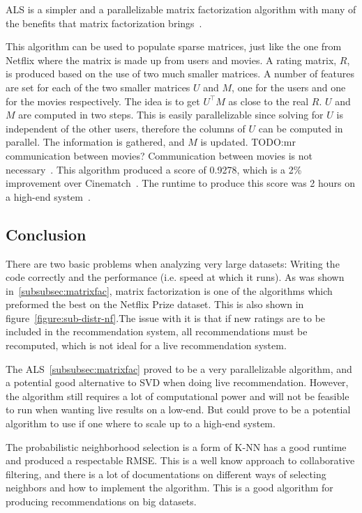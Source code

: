 ALS is a simpler and a parallelizable matrix factorization algorithm with many of the benefits that matrix factorization brings~\cite{predusingmatrix}.

This algorithm can be used to populate sparse matrices, just like the one from Netflix where the matrix is made up from users and movies. A rating matrix, $R$, is produced based on the use of two much smaller matrices. A number of features are set for each of the two smaller matrices $U$ and $M$, one for the users and one for the movies respectively. The idea is to get $U^\top M$ as close to the real $R$. $U$ and $M$ are computed in two steps. This is easily parallelizable since solving for $U$ is independent of the other users, therefore the columns of $U$ can be computed in parallel. The information is gathered, and $M$ is updated.
TODO:mr communication between movies?
Communication between movies is not necessary~\cite{myrrix}. This algorithm produced a score of 0.9278, which is a 2\% improvement over Cinematch~\cite{predusingmatrix}. The runtime to produce this score was 2 hours on a high-end system~\cite{alsMPI}.


\subsection{Conclusion}\label{subsec:sim-sys-conc}
There are two basic problems when analyzing very large datasets: Writing the code correctly and the performance (i.e. speed at which it runs). As was shown in~\ref{subsubsec:matrixfac}, matrix factorization is one of the algorithms which preformed the best on the Netflix Prize dataset. This is also shown in figure~\ref{figure:sub-distr-nf}.The issue with it is that if new ratings are to be included in the recommendation system,  all recommendations must be recomputed, which is not ideal for a live recommendation system.

The ALS~\ref{subsubsec:matrixfac} proved to be a very parallelizable algorithm, and a potential good alternative to SVD when doing live recommendation. However, the algorithm still requires a lot of computational power and will not be feasible to run when wanting live results on a low-end. But could prove to be a potential algorithm to use if one where to scale up to a high-end system.

The probabilistic neighborhood selection is a form of K-NN has a good runtime and produced a respectable RMSE. This is a well know approach to collaborative filtering, and there is a lot of documentations on different ways of selecting neighbors and how to implement the algorithm. This is a good algorithm for producing recommendations on big datasets.



